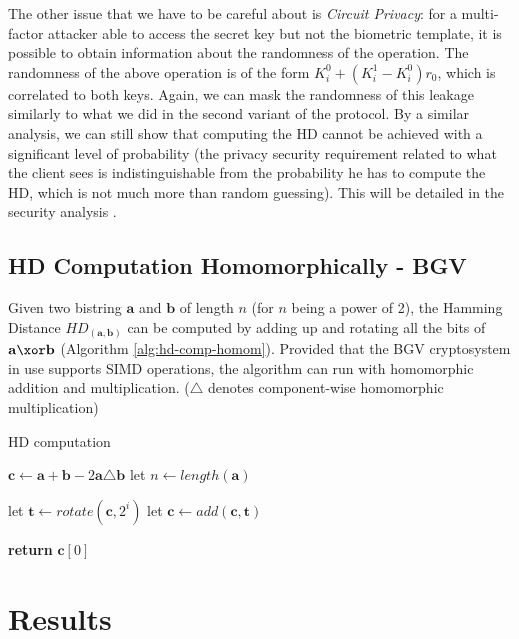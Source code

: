 The other issue that we have to be careful about is \textit{Circuit Privacy}:
for a multi-factor attacker able to access the secret key but not the
biometric template, it is possible to obtain information about the randomness of the
operation. The randomness of the above operation is of the form
\(K_{i}^{0} + (K_{i}^{1} - K_{i}^{0})r_{0}\), which is correlated to both
keys. Again, we can mask the randomness of this leakage similarly to what we did
in the second variant of the protocol. By a similar analysis, we can still show
that computing the HD cannot be achieved with a significant level of probability (the privacy
security requirement related to what the client sees is indistinguishable
from the probability he has to compute the HD, which is not much more than random
guessing). This will be detailed in the security analysis \missref{}.






\subsection{HD Computation Homomorphically - BGV}
Given two bistring \(\mathbf{a}\) and \(\mathbf{b}\) of length \(n\) (for \(n\)
being a power of 2), the Hamming Distance \(HD_{(\mathbf{a,b})}\) can be computed
by adding up and rotating all the bits of \(\mathbf{a} \xor \mathbf{b}\)
(Algorithm \ref{alg:hd-comp-homom}). Provided that the BGV cryptosystem in use
supports SIMD operations, the algorithm can run with homomorphic addition and
multiplication. ($\triangle$ denotes component-wise homomorphic multiplication)

\begin{algorithm}
\caption{HD computation}\label{alg:hd-comp-homom}
\begin{algorithmic}[1]
  \State $\mathbf{c} \gets \mathbf{a} + \mathbf{b} - 2 \mathbf{a} \triangle \mathbf{b}$
  \State let $n \gets length(\mathbf{a})$
  
  \State let $\mathbf{t} \gets rotate(\mathbf{c}, 2^{i})$
  \State let $\mathbf{c} \gets add(\mathbf{c}, \mathbf{t})$

  \EndFor
  
\State \textbf{return} $\mathbf{c}[0]$
\EndProcedure
\end{algorithmic}
\end{algorithm}

\section{Results}
\label{sec:6results}


